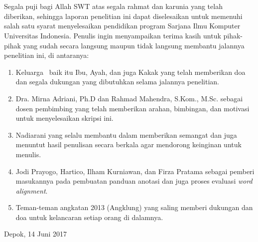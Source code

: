 \chapter*{\kataPengantar}

Segala puji bagi Allah SWT atas segala rahmat dan karunia yang telah diberikan, sehingga laporan penelitian ini dapat diselesaikan untuk memenuhi salah satu syarat menyelesaikan pendidikan program Sarjana Ilmu Komputer Universitas Indonesia. Penulis ingin menyampaikan terima kasih untuk pihak-pihak yang sudah secara langsung maupun tidak langsung membantu jalannya penelitian ini, di antaranya:

\begin{enumerate}
	\item Keluarga \saya~baik itu Ibu, Ayah, dan juga Kakak yang telah memberikan doa dan segala dukungan yang dibutuhkan selama jalannya penelitian.
	\item Dra. Mirna Adriani, Ph.D dan Rahmad Mahendra, S.Kom., M.Sc. sebagai dosen pembimbing yang telah memberikan arahan, bimbingan, dan motivasi untuk menyelesaikan skripsi ini.
	\item Nadiarani yang selalu membantu dalam memberikan semangat dan juga menuntut hasil penulisan secara berkala agar mendorong keinginan untuk menulis.
	\item Jodi Prayogo, Hartico, Ilham Kurniawan, dan Firza Pratama sebagai pemberi masukannya pada pembuatan panduan anotasi dan juga proses evaluasi \textit{word alignment}.
	\item Teman-teman angkatan 2013 (Angklung) yang saling memberi dukungan dan doa untuk kelancaran setiap orang di dalamnya.
	
	
\end{enumerate}
\vspace*{0.1cm}
\begin{flushright}
	Depok, 14 Juni 2017\\[0.1cm]
	\vspace*{1cm}
	\penulis
	
\end{flushright}